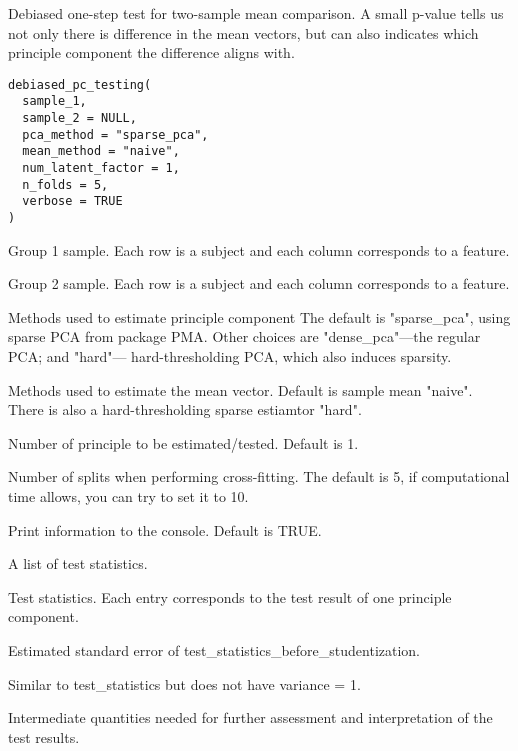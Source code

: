 \documentclass[a4paper]{book}
\begin{document}
%
\begin{Description}
Debiased one-step test for two-sample mean comparison. A small p-value tells us not only there is difference in the mean vectors, but can also indicates which principle component the difference aligns with.
\end{Description}
%
\begin{Usage}
\begin{verbatim}
debiased_pc_testing(
  sample_1,
  sample_2 = NULL,
  pca_method = "sparse_pca",
  mean_method = "naive",
  num_latent_factor = 1,
  n_folds = 5,
  verbose = TRUE
)
\end{verbatim}
\end{Usage}
%
\begin{Arguments}
\begin{ldescription}
\item[\code{sample\_1}] Group 1 sample. Each row is a subject and each column corresponds to a feature.

\item[\code{sample\_2}] Group 2 sample. Each row is a subject and each column corresponds to a feature.

\item[\code{pca\_method}] Methods used to estimate principle component The default is "sparse\_pca", using sparse PCA from package PMA. Other choices are "dense\_pca"---the regular PCA; and "hard"--- hard-thresholding PCA, which also induces sparsity.

\item[\code{mean\_method}] Methods used to estimate the mean vector. Default is sample mean "naive". There is also a hard-thresholding sparse estiamtor "hard".

\item[\code{num\_latent\_factor}] Number of principle to be estimated/tested. Default is 1.

\item[\code{n\_folds}] Number of splits when performing cross-fitting. The default is 5, if computational time allows, you can try to set it to 10.

\item[\code{verbose}] Print information to the console. Default is TRUE.
\end{ldescription}
\end{Arguments}
%
\begin{Value}
A list of test statistics.
\begin{ldescription}
\item[\code{test\_statistics}] Test statistics. Each entry corresponds to the test result of one principle component.
\item[\code{standard\_error}] Estimated standard error of test\_statistics\_before\_studentization.
\item[\code{test\_statistics\_before\_studentization}] Similar to test\_statistics but does not have variance = 1.
\item[\code{split\_data}] Intermediate quantities needed for further assessment and interpretation of the test results.
\end{ldescription}
\end{Value}
\end{document}
